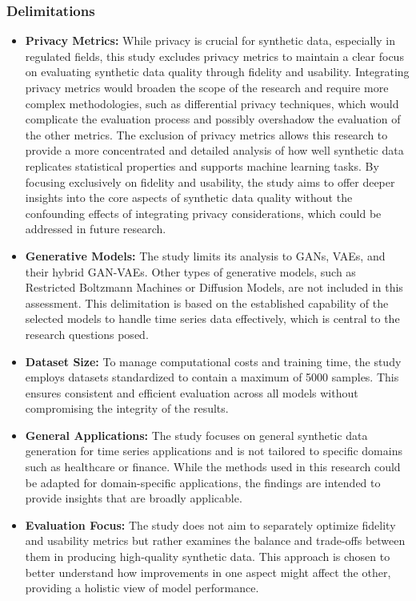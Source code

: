 \documentclass{article}
\begin{document}
\subsubsection{Delimitations}
\begin{itemize}
    \item \textbf{Privacy Metrics:} While privacy is crucial for synthetic data, especially in regulated fields, this study excludes privacy metrics to maintain a clear focus on evaluating synthetic data quality through fidelity and usability. Integrating privacy metrics would broaden the scope of the research and require more complex methodologies, such as differential privacy techniques, which would complicate the evaluation process and possibly overshadow the evaluation of the other metrics. The exclusion of privacy metrics allows this research to provide a more concentrated and detailed analysis of how well synthetic data replicates statistical properties and supports machine learning tasks. By focusing exclusively on fidelity and usability, the study aims to offer deeper insights into the core aspects of synthetic data quality without the confounding effects of integrating privacy considerations, which could be addressed in future research.

    \item \textbf{Generative Models:} The study limits its analysis to GANs, VAEs, and their hybrid GAN-VAEs. Other types of generative models, such as Restricted Boltzmann Machines or Diffusion Models, are not included in this assessment. This delimitation is based on the established capability of the selected models to handle time series data effectively, which is central to the research questions posed.

    \item \textbf{Dataset Size:} To manage computational costs and training time, the study employs datasets standardized to contain a maximum of 5000 samples. This ensures consistent and efficient evaluation across all models without compromising the integrity of the results.
    
    \item \textbf{General Applications:} The study focuses on general synthetic data generation for time series applications and is not tailored to specific domains such as healthcare or finance. While the methods used in this research could be adapted for domain-specific applications, the findings are intended to provide insights that are broadly applicable.

    \item \textbf{Evaluation Focus:} The study does not aim to separately optimize fidelity and usability metrics but rather examines the balance and trade-offs between them in producing high-quality synthetic data. This approach is chosen to better understand how improvements in one aspect might affect the other, providing a holistic view of model performance. 

\end{itemize}
\end{document}
